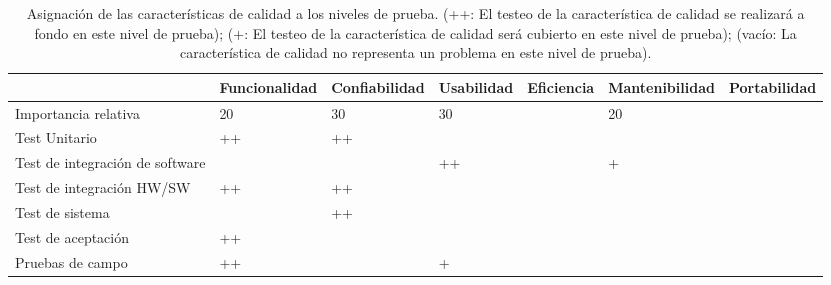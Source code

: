 \documentclass[12pt,a4paper, twosite]{article}
\begin{document}
\begin{table}[htbp]
    \centering

    \begin{adjustwidth}{-1in}{-1in}%
        \begin{tabular}{|l|l|l|l|l|l|l|}\hline \hline
                                            & \bf Funcionalidad  & \bf
            Confiabilidad                   & \bf Usabilidad     & \bf
            Eficiencia                      & \bf Mantenibilidad & \bf
            Portabilidad                                                      \\ \hline
            \hline
            Importancia relativa            & 20                 &
            30                              & 30                 &     & 20 &
            \\
            Test Unitario                   & ++                 & ++
                                            &                    &     &    & \\
            Test de integración de software &                    &
                                            & ++                 &     & +  &
            \\
            Test de integración HW/SW       & ++                 & ++
                                            &                    &     &    &
            \\
            Test de sistema                 &                    & ++
                                            &                    &     &    & \\
            Test de aceptación              & ++                 &
                                            &                    &     &
                                            &
            \\
            Pruebas de campo                & ++                 &
                                            & +                  &     &    &
            \\ \hline
        \end{tabular}
        \caption{Asignación de las características de calidad a los niveles de
            prueba. (++: El testeo de la característica de calidad
            se realizará a fondo en este nivel de prueba); (+: El testeo de la
            característica de calidad será cubierto en este nivel de
            prueba); (vacío: La característica de calidad no representa un problema en este
            nivel de prueba).}
    \end{adjustwidth}

\end{table}
\end{document}
